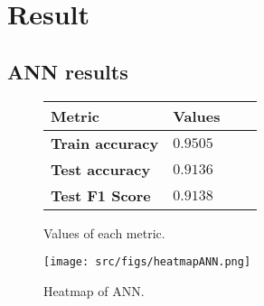 \section{Result}

\subsection{ANN results}
\begin{figure}[H]
    \centering
    \begin{tabular}{|l|l|l|l|}
        \hline
        \rowcolor{gray!50}
        Metric & Values   \\ \hline
        \textbf{Train accuracy} & $0.9505$ \\ \hline
        \textbf{Test accuracy} & $0.9136$ \\ \hline
        \textbf{Test F1 Score} & $0.9138$ \\ \hline
    \end{tabular}
    \caption{Values of each metric.}
\end{figure}

\begin{figure}[H]
    \centering
    \texttt{[image: src/figs/heatmapANN.png]}
    \caption{Heatmap of ANN.}
    \label{fig:ANNheatmap}
\end{figure}


